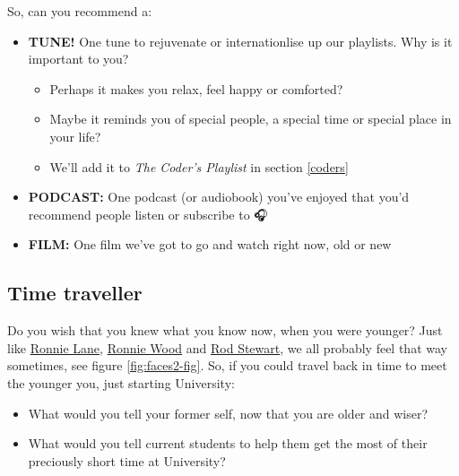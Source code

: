 \documentclass[
]{book}
\providecommand{\tightlist}{%
  \setlength{\itemsep}{0pt}\setlength{\parskip}{0pt}}
\begin{document}
So, can you recommend a:

\begin{itemize}
\tightlist
\item
  \textbf{TUNE!} One tune to rejuvenate or internationlise up our playlists. Why is it important to you?

  \begin{itemize}
  \tightlist
  \item
    Perhaps it makes you relax, feel happy or comforted?
  \item
    Maybe it reminds you of special people, a special time or special place in your life?
  \item
    We'll add it to \emph{The Coder's Playlist} in section \ref{coders}
  \end{itemize}
\item
  \textbf{PODCAST:} One podcast (or audiobook) you've enjoyed that you'd recommend people listen or subscribe to 🎧
\item
  \textbf{FILM:} One film we've got to go and watch right now, old or new 🍿
\end{itemize}

\hypertarget{your-time}{%
\subsection{Time traveller}\label{your-time}}

Do you wish that you knew what you know now, when you were younger? Just like \href{https://en.wikipedia.org/wiki/Ronnie_Lane}{Ronnie Lane}, \href{https://en.wikipedia.org/wiki/Ronnie_Wood}{Ronnie Wood} and \href{https://en.wikipedia.org/wiki/Rod_Stewart}{Rod Stewart}, we all probably feel that way sometimes, see figure \ref{fig:faces2-fig}. So, if you could travel back in time to meet the younger you, just starting University:

\begin{itemize}
\tightlist
\item
  What would you tell your former self, now that you are older and wiser?
\item
  What would you tell current students to help them get the most of their preciously short time at University?
\end{itemize}
\end{document}
